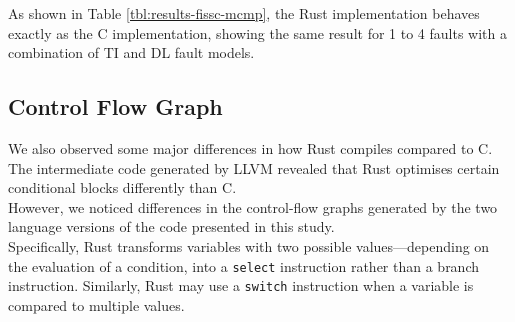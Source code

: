 As shown in Table \ref{tbl:results-fissc-mcmp}, the Rust implementation behaves exactly as the C implementation, showing the same result for 1 to 4 faults with a combination of TI and DL fault models.


       
\subsection{Control Flow Graph}
\label{subsection:result cfg}
We also observed some major differences in how Rust compiles compared to C.\\
The intermediate code generated by LLVM revealed that Rust optimises certain conditional blocks differently than C.\\

However, we noticed differences in the control-flow graphs generated by the two language versions of the code presented in this study.\\
Specifically, Rust transforms variables with two possible values—depending on the evaluation of a condition, into a \texttt{select} instruction rather than a branch instruction.
Similarly, Rust may use a \texttt{switch} instruction when a variable is compared to multiple values.
